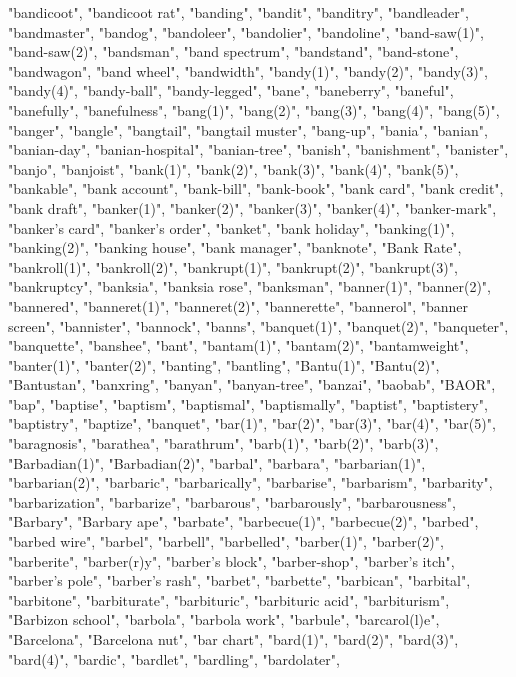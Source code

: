 "bandicoot",
"bandicoot rat",
"banding",
"bandit",
"banditry",
"bandleader",
"bandmaster",
"bandog",
"bandoleer",
"bandolier",
"bandoline",
"band-saw(1)",
"band-saw(2)",
"bandsman",
"band spectrum",
"bandstand",
"band-stone",
"bandwagon",
"band wheel",
"bandwidth",
"bandy(1)",
"bandy(2)",
"bandy(3)",
"bandy(4)",
"bandy-ball",
"bandy-legged",
"bane",
"baneberry",
"baneful",
"banefully",
"banefulness",
"bang(1)",
"bang(2)",
"bang(3)",
"bang(4)",
"bang(5)",
"banger",
"bangle",
"bangtail",
"bangtail muster",
"bang-up",
"bania",
"banian",
"banian-day",
"banian-hospital",
"banian-tree",
"banish",
"banishment",
"banister",
"banjo",
"banjoist",
"bank(1)",
"bank(2)",
"bank(3)",
"bank(4)",
"bank(5)",
"bankable",
"bank account",
"bank-bill",
"bank-book",
"bank card",
"bank credit",
"bank draft",
"banker(1)",
"banker(2)",
"banker(3)",
"banker(4)",
"banker-mark",
"banker's card",
"banker's order",
"banket",
"bank holiday",
"banking(1)",
"banking(2)",
"banking house",
"bank manager",
"banknote",
"Bank Rate",
"bankroll(1)",
"bankroll(2)",
"bankrupt(1)",
"bankrupt(2)",
"bankrupt(3)",
"bankruptcy",
"banksia",
"banksia rose",
"banksman",
"banner(1)",
"banner(2)",
"bannered",
"banneret(1)",
"banneret(2)",
"bannerette",
"bannerol",
"banner screen",
"bannister",
"bannock",
"banns",
"banquet(1)",
"banquet(2)",
"banqueter",
"banquette",
"banshee",
"bant",
"bantam(1)",
"bantam(2)",
"bantamweight",
"banter(1)",
"banter(2)",
"banting",
"bantling",
"Bantu(1)",
"Bantu(2)",
"Bantustan",
"banxring",
"banyan",
"banyan-tree",
"banzai",
"baobab",
"BAOR",
"bap",
"baptise",
"baptism",
"baptismal",
"baptismally",
"baptist",
"baptistery",
"baptistry",
"baptize",
"banquet",
"bar(1)",
"bar(2)",
"bar(3)",
"bar(4)",
"bar(5)",
"baragnosis",
"barathea",
"barathrum",
"barb(1)",
"barb(2)",
"barb(3)",
"Barbadian(1)",
"Barbadian(2)",
"barbal",
"barbara",
"barbarian(1)",
"barbarian(2)",
"barbaric",
"barbarically",
"barbarise",
"barbarism",
"barbarity",
"barbarization",
"barbarize",
"barbarous",
"barbarously",
"barbarousness",
"Barbary",
"Barbary ape",
"barbate",
"barbecue(1)",
"barbecue(2)",
"barbed",
"barbed wire",
"barbel",
"barbell",
"barbelled",
"barber(1)",
"barber(2)",
"barberite",
"barber(r)y",
"barber's block",
"barber-shop",
"barber's itch",
"barber's pole",
"barber's rash",
"barbet",
"barbette",
"barbican",
"barbital",
"barbitone",
"barbiturate",
"barbituric",
"barbituric acid",
"barbiturism",
"Barbizon school",
"barbola",
"barbola work",
"barbule",
"barcarol(l)e",
"Barcelona",
"Barcelona nut",
"bar chart",
"bard(1)",
"bard(2)",
"bard(3)",
"bard(4)",
"bardic",
"bardlet",
"bardling",
"bardolater",
